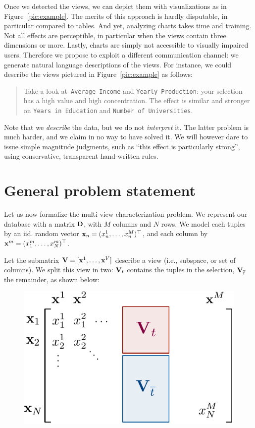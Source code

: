 Once we detected the views, we can depict them with visualizations as in
Figure~\ref{pic:example}. The merits of this approach is hardly disputable, in
particular compared to tables. And yet, analyzing charts takes time and
training. Not all effects are perceptible, in particular when the views
contain three dimensions or more. Lastly, charts are simply not accessible to
visually impaired users. Therefore we propose to exploit a
different communication channel: we generate natural language descriptions of
the views. For instance, we could describe the views pictured in
Figure~\ref{pic:example} as follows:
\begin{quotation}
    Take a look at~\texttt{Average Income} and \texttt{Year\-ly Production}:
    your selection has a high value and high concentration. The effect is
    similar and stronger on \texttt{Years in Education} and \texttt{Number of
    Universities}.
\end{quotation}
Note that we \emph{describe} the data, but we do not \emph{interpret} it. The
latter problem is much harder, and we claim in no way to have solved it. We
will however dare to issue simple ma\-gni\-tude judgments, such as ``this
effect is particularly strong'', using conservative, transparent hand-written
rules.


\section{General problem statement}
\label{sec:problem}
Let us now formalize the multi-view characterization problem. We represent our
database with a matrix $\mathbf{D}$, with $M$ columns and $N$ rows.  We model 
each tuples by an iid. random vector  $\mathbf{x}_n = (x^1_n, \dots, x^M_n)^\top$,
and each column by  $\mathbf{x}^{m}= (x^m_1, \dots, x^m_N)^\top$.

Let the submatrix $\mathbf{V}  = [\mathbf{x}^1, \dots, \mathbf{x}^V]$ describe a view
(i.e., subspace, or set of columns). We split this view in two:  ${\mathbf{V}}_t$
contains the tuples in the selection, ${\mathbf{V}}_{\overline{t}}$ the remainder,
as shown below:
\begin{figure}[h!]
  \centering
  \includegraphics[width=0.5\columnwidth]{Figures/Notations}
  \label{pic:notations}
\end{figure}


